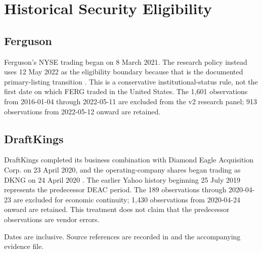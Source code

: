 \section{Historical Security Eligibility}
\label{sec:eligibility}

\subsection{Ferguson}

Ferguson's NYSE trading began on 8 March 2021. The research policy instead uses
12 May 2022 as the eligibility boundary because that is the documented
primary-listing transition \citep{secFERG2021,secFERG2022}. This is a conservative institutional-status rule,
not the first date on which FERG traded in the United States. The 1,601
observations from 2016-01-04 through 2022-05-11 are excluded from the v2
research panel; 913 observations from 2022-05-12 onward are retained.

\subsection{DraftKings}

DraftKings completed its business combination with Diamond Eagle Acquisition
Corp. on 23 April 2020, and the operating-company shares began trading as DKNG
on 24 April 2020 \citep{secDKNG2020}. The earlier Yahoo history beginning 25 July 2019 represents
the predecessor DEAC period. The 189 observations through 2020-04-23 are
excluded for economic continuity; 1,430 observations from 2020-04-24 onward are
retained. This treatment does not claim that the predecessor observations are
vendor errors.

\begin{table}[H]
\centering
\caption{Historical eligibility policy}
\label{tab:eligibility-policy}
\scriptsize
{}
\begin{tablenotes}\small
\item Dates are inclusive. Source references are recorded in
 and the accompanying evidence file.
\end{tablenotes}
\end{table}

\begin{table}[H]
\centering
\caption{Historical exclusion reconciliation}
\label{tab:exclusions}
\end{table}

